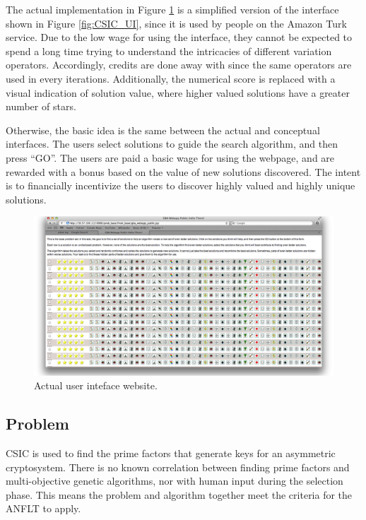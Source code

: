 The actual implementation in Figure \ref{fig:website_UI} is a simplified version of the interface shown in Figure \ref{fig:CSIC_UI}, since it is used by people on the Amazon Turk service.  Due to the low wage for using the interface, they cannot be expected to spend a long time trying to understand the intricacies of different variation operators.  Accordingly, credits are done away with since the same operators are used in every iterations.  Additionally, the numerical score is replaced with a visual indication of solution value, where higher valued solutions have a greater number of stars.

Otherwise, the basic idea is the same between the actual and conceptual interfaces.  The users select solutions to guide the search algorithm, and then press ``GO''.  The users are paid a basic wage for using the webpage, and are rewarded with a bonus based on the value of new solutions discovered.  The intent is to financially incentivize the users to discover highly valued and highly unique solutions. 

\begin{figure}[!t]
  \centering
  \includegraphics[width=4.5in]{HollowayWebsiteUI}
  \caption{Actual user inteface website.}
  \label{fig:website_UI}
\end{figure}

\subsection{Problem}\label{sec:problem}

CSIC is used to find the prime factors that generate keys for an asymmetric cryptosystem.  There is no known correlation between finding prime factors and multi-objective genetic algorithms, nor with human input during the selection phase.  This means the problem and algorithm together meet the criteria for the ANFLT to apply. 

